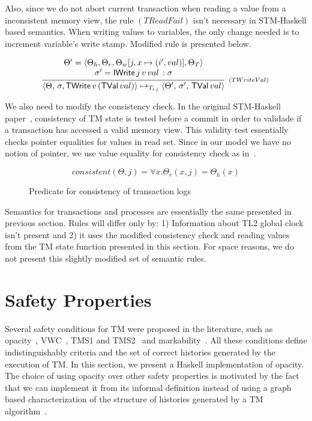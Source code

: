 \documentclass{fundam}
\newcommand{\C}[1]{\red{\mathsf{#1}}}
\begin{document}
Also, since we do not abort current transaction when reading a value from a inconsistent
memory view, the rule $(TReadFail)$ isn't necessary in STM-Haskell based semantics. When writing
values to variables, the only change needed is to increment variable's write stamp.
Modified rule is presented below.

\[
  \begin{array}{l}
  \infer[_{(TWriteVal)}]
        { \langle \Theta, \, \sigma, \ensuremath{\C{TWrite}}\,v\,(\ensuremath{\C{TVal}}\,val)\rangle \mapsto_{T_{i\,j}}
          \langle \Theta', \, \sigma',\,\ensuremath{\C{TVal}}\,val\rangle}
        {\begin{array}{c}
            \Theta' = \langle \Theta_h, \Theta_r, \Theta_w[j,x \mapsto (i',val)], \Theta_T\rangle \\
            \sigma' = \ensuremath{\C{IWrite}}\,j\,v\,val\, : \sigma \\
         \end{array}}
  \end{array}
\]


We also need to modify the consistency check. In the original STM-Haskell paper~\cite{Harris05}, consistency
of TM state is tested before a commit in order to validade if a transaction has accessed a valid memory view.
This validity test essentially checks pointer equalities for values in read set. Since in our model we have no
notion of pointer, we use value equality for consistency check as in~\cite{Hu08}.
\begin{figure}[h]
  \[
     consistent(\Theta,j) = \forall x. \Theta_r(x,j) = \Theta_h(x)
  \]
  \centering
  \caption{Predicate for consistency of transaction logs}
  \label{fig:consistency1}
\end{figure}

Semantics for transactions and processes are essentially the same presented in previous section. Rules will
differ only by: 1) Information about TL2 global clock isn't present and 2) it uses the modified consistency
check and reading values from the TM state function presented in this section. For space reasons, we do not
present this slightly modified set of semantic rules.

\section{Safety Properties}\label{sec:stm-safety}

Several safety conditions for TM were proposed in the literature, such as opacity~\cite{Guerraoui2008},
VWC~\cite{Imbs2009}, TMS1 and TMS2~\cite{Doherty2009} and markability~\cite{LesaniP14}. All these conditions define
indistinguishably criteria and the set of correct histories generated by the execution of TM. In this section, we
present a Haskell implementation of opacity. The choice of using opacity over other safety properties is motivated
by the fact that we can implement it from its informal definition instead of using
a graph based characterization of the structure of histories generated by a TM algorithm~\cite{Gueraoui2008}.
\end{document}
